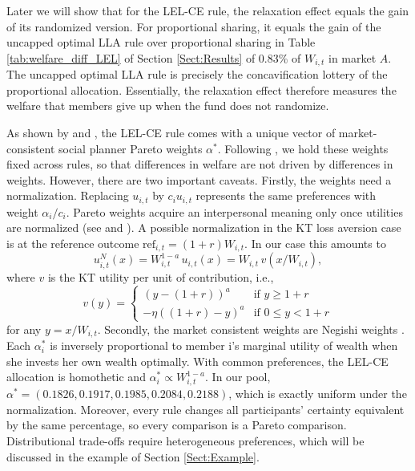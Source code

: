 \documentclass[11pt,a4paper]{article}
\theoremstyle{definition}
\theoremstyle{plain}
\theoremstyle{remark}
\newcommand{\1}{\mathbf{1}}
\begin{document}
Later we will show that for the LEL-CE rule, the relaxation effect equals the gain of its randomized version. For proportional sharing, it equals the gain of the uncapped optimal LLA rule over proportional sharing in Table \ref{tab:welfare_diff_LEL} of Section \ref{Sect:Results} of 0.83\% of $W_{i,t}$ in market $A$. The uncapped optimal LLA rule is precisely the concavification lottery of the proportional allocation. Essentially, the relaxation effect therefore measures the welfare that members give up when the fund does not randomize.

As shown by \citet{Pazderaetal2017} and \citet{NgNguyen2025}, the LEL-CE rule comes with a unique vector of market-consistent social planner Pareto weights $\alpha^*$. Following \citet{DavilaSchaab2025}, we hold these weights fixed across rules, so that differences in welfare are not driven by differences in weights. However, there are two important caveats. Firstly, the weights need a normalization. Replacing $u_{i,t}$ by $c_i u_{i,t}$ represents the same preferences with weight $\alpha_i/c_i$. Pareto weights acquire an interpersonal meaning only once utilities are normalized (see \citet{Harsanyi1955} and \citet{dAspremontGevers1977}). A possible normalization in the KT loss aversion case is at the reference outcome $\text{ref}_{i,t} = (1+r) W_{i,t}$. In our case this amounts to
\begin{equation}
    u^N_{i,t}(x)=W_{i,t}^{1-a}\,u_{i,t}(x)=W_{i,t}\,v(x/W_{i,t}),
\end{equation}
where $v$ is the KT utility per unit of contribution, i.e., 
\begin{equation}
    \label{eq:Loss_Averion_Per_Unit_Contribution}
    v(y) = \begin{cases} (y - (1+r))^a & \text{if } y \ge 1+r \\ -\eta ((1+r) - y)^a & \text{if } 0 \le y < 1+r \end{cases}
\end{equation}
for any $y = x/W_{i,t}$. Secondly, the market consistent weights are Negishi weights \citep{Negishi1960}. Each $\alpha_i^*$ is inversely proportional to member i's marginal utility of wealth when she invests her own wealth optimally. With common preferences, the LEL-CE allocation is homothetic and $\alpha_i^* \propto W_{i,t}^{1-a}$. In our pool, $\alpha^* = (0.1826, 0.1917, 0.1985, 0.2084, 0.2188)$, which is exactly uniform under the normalization. Moreover, every rule changes all participants' certainty equivalent by the same percentage, so every comparison is a Pareto comparison. Distributional trade-offs require heterogeneous preferences, which will be discussed in the example of Section \ref{Sect:Example}.
\end{document}
